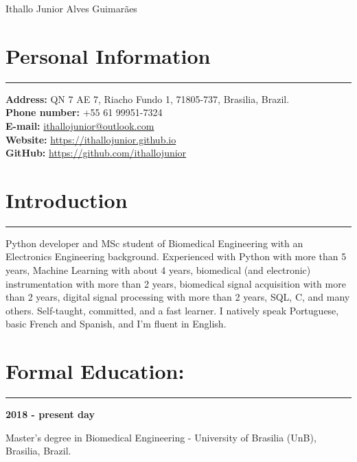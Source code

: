 \documentclass[11pt]{article}
\begin{document}
\begin{center}
\huge{Ithallo Junior Alves Guimarães}
\end{center}

\section{Personal Information}
\hrule \vspace{0.1cm}

\begin{addmargin}{0.5cm}

\textbf{Address:}  QN 7 AE 7, Riacho Fundo 1, 71805-737, Brasilia, Brazil. \\
\textbf{Phone number:}  +55 61 99951-7324 \\
\textbf{E-mail:}   \href{maito:ithallojunior@outlook.com}{ithallojunior@outlook.com} \\ 
\textbf{Website:}  \url{https://ithallojunior.github.io}  \\
\textbf{GitHub:} \url{https://github.com/ithallojunior}

\end{addmargin}

\section{Introduction}
\hrule \vspace{0.1cm}

\begin{addmargin}{0.5cm}
Python developer and MSc student of Biomedical Engineering with an Electronics Engineering background.
Experienced with Python with more than 5 years, Machine Learning with about 4 years, 
biomedical (and electronic) instrumentation with more than 2 years, biomedical signal 
acquisition with more than 2 years, digital signal processing with more than 2 years, SQL, C, 
and many others. Self-taught, committed, and a fast learner. I natively speak Portuguese,
basic French and Spanish, and I'm fluent in English.

\end{addmargin}

\section{Formal Education:}
\hrule \vspace{0.1cm}

\textbf{2018 - present day}
\begin{addmargin}{0.5cm}
Master's degree in Biomedical Engineering - University of Brasilia (UnB), Brasilia, Brazil. \\
\end{addmargin}
\end{document}
